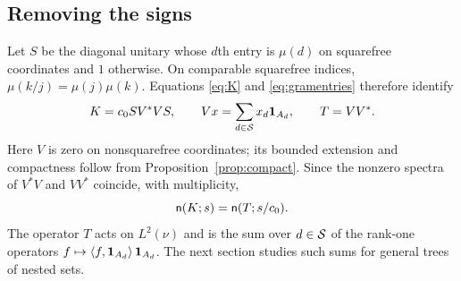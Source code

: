 \subsection{Removing the signs}
Let $S$ be the diagonal unitary whose $d$th entry is $\mu(d)$ on squarefree
coordinates and $1$ otherwise. On comparable squarefree indices,
$\mu(k/j)=\mu(j)\mu(k)$. Equations \eqref{eq:K} and \eqref{eq:gramentries}
therefore identify
\begin{equation}\label{eq:gram-identification}
 K=c_0 S V^*VS,\qquad
 Vx=\sum_{d\in\mathcal S}x_d\mathbf 1_{A_d},
 \qquad T=VV^*.
\end{equation}
Here $V$ is zero on nonsquarefree coordinates; its bounded extension and
compactness follow from Proposition~\ref{prop:compact}. Since the nonzero
spectra of $V^*V$ and $VV^*$ coincide, with multiplicity,
\begin{equation}\label{eq:countscale}
 \mathsf n(K;s)=\mathsf n(T;s/c_0).
\end{equation}
The operator $T$ acts on $L^2(\nu)$ and is the sum over $d\in\mathcal S$ of the
rank-one operators $f\mapsto\left\langle f,\mathbf 1_{A_d}\right\rangle\mathbf 1_{A_d}$. The next
section studies such sums for general trees of nested sets.
